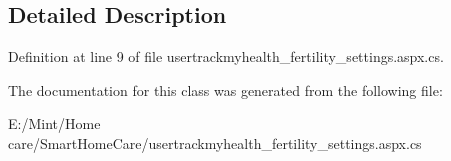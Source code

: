 \subsection{Detailed Description}


Definition at line 9 of file usertrackmyhealth\-\_\-fertility\-\_\-settings.\-aspx.\-cs.



The documentation for this class was generated from the following file\-:\begin{DoxyCompactItemize}
\item 
E\-:/\-Mint/\-Home care/\-Smart\-Home\-Care/usertrackmyhealth\-\_\-fertility\-\_\-settings.\-aspx.\-cs\end{DoxyCompactItemize}
